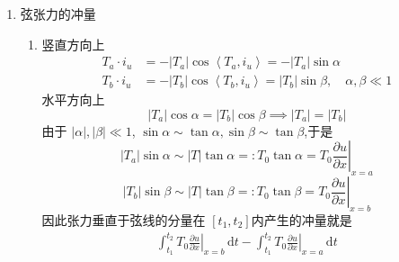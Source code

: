 \documentclass[../../PDE.tex]{subfiles}
\begin{document}
\begin{enumerate}
\item 弦张力的冲量
\begin{enumerate}
     \item 竖直方向上\[
        \begin{aligned}
        T_{a}\cdot i_{u}& =- \left| T_{a} \right|\cos \left<T_{a},i_{u} \right> =  -\left| T_{a} \right|\sin  \alpha \\ 
           T _{b}\cdot i_{u}&= -\left| T_{b}\right| \cos \left<T_{b},i_{u} \right>= \left| T_{b} \right|\sin  \beta  , \quad  \alpha , \beta \ll 1
        \end{aligned}
        \]水平方向上 \[
        \left| T_{a} \right|\cos \alpha =  \left| T_{b} \right|\cos \beta \implies \left| T_{a} \right|   = \left| T_{b} \right| 
        \]由于 \(  \left| \alpha  \right|,\left|  \beta  \right|\ll 1    \), \(  \sin \alpha \sim \tan \alpha ,\sin \beta \sim \tan \beta   \),于是 \[
        \left| T_{a} \right|\sin  \alpha \sim \left| T \right|\tan  \alpha = : T_0\tan \alpha  = \left. T_0 \frac{\partial u}{\partial x}    \right|_{x =  a} 
        \]  \[
        \left| T_{b} \right|\sin \beta \sim \left| T \right|\tan \beta = : T_0\tan \beta   = \left. T_0\frac{\partial u}{\partial x} \right|_{x= b}
        \]因此张力垂直于弦线的分量在 \(  [t_1,t_2]  \)内产生的冲量就是 \[
        \begin{aligned}
    \int_{t_1}^{t_2} \left. T_0 \frac{\partial u}{\partial x} \right|_{x= b}\,\mathrm{d} t- \int_{t_1}^{t_2} \left. T_0 \frac{\partial u}{\partial x} \right|_{x= a}\,\mathrm{d} t 
        \end{aligned}
        \] 
\end{enumerate}


\end{enumerate}
\end{document}
